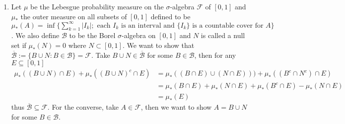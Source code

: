 \documentclass[a4paper,10pt]{article}
\theoremstyle{definition}
\begin{document}
\begin{enumerate}
\item Let $\mu$ be the Lebesgue probability measure on the $\sigma$-algebra $\mathcal{F}$ of $[0,1]$ and $\mu_\ast$ the outer measure on all subsets of $[0,1]$ defined to be $\mu_\ast(A)=\inf \{\sum_{k=1}^{\infty}|I_k|; \text{ each }I_k \text{ is an interval and }\{I_k\} \text{ is a countable cover for } A\}$. We also define $\mathcal{B}$ to be the Borel $\sigma$-algebra on $[0,1]$ and $N$ is called a null set if $\mu_\ast(N)=0$ where $N \subset [0,1]$. We want to show that $\overline{\mathcal{B}}:=\{B \cup N: B \in \mathcal{B}\}=\mathcal{F}$. Take $B \cup N \in \overline{\mathcal{B}}$ for some $B \in \mathcal{B}$, then for any $E \subseteq [0,1]$
\begin{align*}
 \mu_\ast((B \cup N) \cap E) + \mu_\ast((B \cup N)^c \cap E)&= \mu_\ast((B \cap E)\cup (N\cap E)) ) + \mu_\ast((B^c \cap N^c) \cap E)\\
&= \mu_\ast(B \cap E)+ \mu_\ast(N\cap E ) + \mu_\ast(B^c  \cap E) - \mu_\ast(N \cap E)\\
&=\mu_\ast(E)
\end{align*}
thus $\overline{\mathcal{B}} \subseteq \mathcal{F}$. For the converse, take $A \in \mathcal{F}$, then we want to show $A = B \cup N$ for some $B \in \mathcal{B}$.
\end{enumerate}
\end{document}
